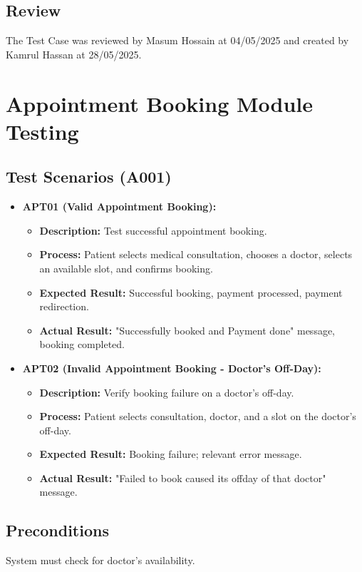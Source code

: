\documentclass{article}
\begin{document}
\subsection{Review}
The Test Case was reviewed by Masum Hossain at 04/05/2025 and created by Kamrul Hassan at 28/05/2025.

\section{Appointment Booking Module Testing}

\subsection{Test Scenarios (A001)}

\begin{itemize}
    \item \textbf{APT01 (Valid Appointment Booking):}
    \begin{itemize}
        \item \textbf{Description:} Test successful appointment booking.
        \item \textbf{Process:} Patient selects medical consultation, chooses a doctor, selects an available slot, and confirms booking.
        \item \textbf{Expected Result:} Successful booking, payment processed, payment redirection.
        \item \textbf{Actual Result:} "Successfully booked and Payment done" message, booking completed.
    \end{itemize}
    \item \textbf{APT02 (Invalid Appointment Booking - Doctor's Off-Day):}
    \begin{itemize}
        \item \textbf{Description:} Verify booking failure on a doctor's off-day.
        \item \textbf{Process:} Patient selects consultation, doctor, and a slot on the doctor's off-day.
        \item \textbf{Expected Result:} Booking failure; relevant error message.
        \item \textbf{Actual Result:} "Failed to book caused its offday of that doctor" message.
    \end{itemize}
\end{itemize}

\subsection{Preconditions}
System must check for doctor's availability.
\end{document}

